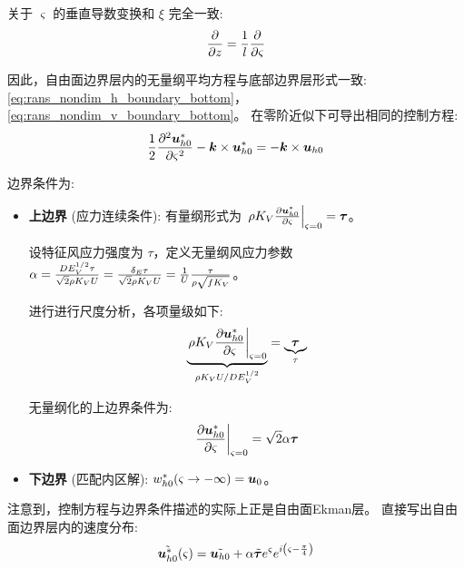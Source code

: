 关于 $\varsigma$ 的垂直导数变换和 $\xi$ 完全一致:
\begin{equation}
    \pde{}{z} = \frac{1}{l} \pde{}{\varsigma}
    \label{eq:vertical_derivative_transform_top}
\end{equation}

因此，自由面边界层内的无量纲平均方程与底部边界层形式一致: \eqref{eq:rans_nondim_h_boundary_bottom}，\eqref{eq:rans_nondim_v_boundary_bottom}。
在零阶近似下可导出相同的控制方程:
\begin{equation*}
    \frac{1}{2} \pde[2]{\flayer{\vel_{h0}}}{\varsigma} -\kvec \times \flayer{\vel_{h0}} = -\kvec \times \vel_{h0}
\end{equation*}

边界条件为:
\begin{itemize}
    \item \textbf{上边界} (应力连续条件):
    有量纲形式为 $\left.\density \eddyviscv \pde{\flayer{\vel_{h0}}}{\varsigma}\right|_{\varsigma = 0} = \wind$。

    设特征风应力强度为 $\tau$，定义无量纲风应力参数 $\alpha = \frac{D E_V^{1/2} \tau}{\sqrt{2} \rho K_V U} = \frac{\delta_E \tau}{\sqrt{2} \rho K_V U} = \frac{1}{U} \frac{\tau}{\rho \sqrt{f K_V}}$。

    进行进行尺度分析，各项量级如下:
    \begin{equation*}
        \underbrace{\left.\density \eddyviscv \pde{\flayer{\vel_{h0}}}{\varsigma}\right|_{\varsigma = 0}}_{\density \eddyviscv \hvel / \vscale \ev^{1/2}} = \underbrace{\wind}_{\tau}
    \end{equation*}

    无量纲化的上边界条件为:
    \begin{equation*}
        \left.\pde{\flayer{\vel_{h0}}}{\varsigma}\right|_{\varsigma = 0} = \sqrt{2} \alpha \wind
    \end{equation*}

    \item \textbf{下边界} (匹配内区解): $w_{h0}^*(\varsigma \to -\infty) = \bm{u}_{0}$。
\end{itemize}

注意到，控制方程与边界条件描述的实际上正是自由面Ekman层。
直接写出自由面边界层内的速度分布:
\begin{equation}
    \tilde{\bm{u}_{h0}^*}(\varsigma) = \tilde{\bm{u}_{h0}} + \alpha \tilde{{\bm{\tau}}} e^{\varsigma} e^{i \left(\varsigma - \frac{\pi}{4}\right)}
    \label{eq:solution_complex_boundary_top}
\end{equation}

